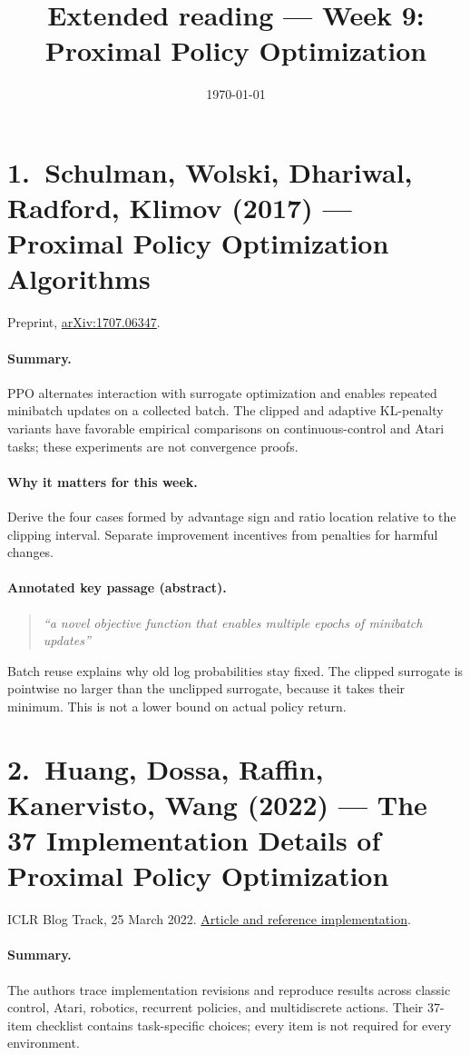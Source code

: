 \documentclass[11pt]{scrartcl}
\title{Extended reading --- Week 9: Proximal Policy Optimization}
\date{\today}
\begin{document}
\maketitle

\section*{1.\ Schulman, Wolski, Dhariwal, Radford, Klimov (2017) --- Proximal Policy Optimization Algorithms}
Preprint, \href{https://arxiv.org/abs/1707.06347}{arXiv:1707.06347}.

\paragraph{Summary.} PPO alternates interaction with surrogate optimization and enables repeated minibatch updates on a collected batch. The clipped and adaptive KL-penalty variants have favorable empirical comparisons on continuous-control and Atari tasks; these experiments are not convergence proofs.
\paragraph{Why it matters for this week.} Derive the four cases formed by advantage sign and ratio location relative to the clipping interval. Separate improvement incentives from penalties for harmful changes.
\paragraph{Annotated key passage (abstract).}
\begin{quote}\emph{``a novel objective function that enables multiple epochs of minibatch updates''}\end{quote}
Batch reuse explains why old log probabilities stay fixed. The clipped surrogate is pointwise no larger than the unclipped surrogate, because it takes their minimum. This is not a lower bound on actual policy return.


\section*{2.\ Huang, Dossa, Raffin, Kanervisto, Wang (2022) --- The 37 Implementation Details of Proximal Policy Optimization}
ICLR Blog Track, 25 March 2022. \href{https://iclr-blog-track.github.io/2022/03/25/ppo-implementation-details/}{Article and reference implementation}.

\paragraph{Summary.} The authors trace implementation revisions and reproduce results across classic control, Atari, robotics, recurrent policies, and multidiscrete actions. Their 37-item checklist contains task-specific choices; every item is not required for every environment.
\end{document}
